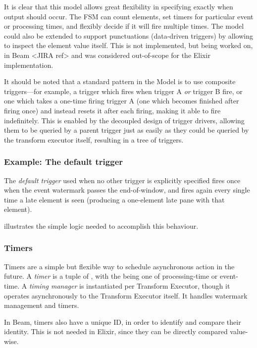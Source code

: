 It is clear that this model allows great flexibility in specifying exactly when output should occur.
The FSM can count elements, set timers for particular event or processing times, and flexibly decide if it will fire multiple times.
The model could also be extended to support punctuations (data-driven triggers) by allowing  to inspect the element value itself.
This is not implemented, but being worked on, in Beam <JIRA ref> and was considered out-of-scope for the Elixir implementation.

It should be noted that a standard pattern in the Model is to use composite triggers---for example, a trigger which fires when trigger A \emph{or} trigger B fire, or one which takes a one-time firing trigger A (one which becomes finished after firing once) and instead resets it after each firing, making it able to fire indefinitely.
This is enabled by the decoupled design of trigger drivers, allowing them to be queried by a parent trigger just as easily as they could be queried by the transform executor itself, resulting in a tree of triggers.

\subsubsection{Example: The default trigger}

The \emph{default trigger} used when no other trigger is explicitly specified fires once when the event watermark passes the end-of-window, and fires again every single time a late element is seen (producing a one-element late pane with that element).

 illustrates the simple logic needed to accomplish this behaviour.

\subsubsection{Timers}

Timers are a simple but flexible way to schedule asynchronous action in the future.
A \emph{timer} is a tuple of \footnotemark, with the  being one of processing-time or event-time.
A \emph{timing manager} is instantiated per Transform Executor, though it operates asynchronously to the Transform Executor itself.
It handles watermark management and timers.

\footnotetext
{
In Beam, timers also have a unique ID, in order to identify and compare their identity. This is not needed in Elixir, since they can be directly compared value-wise.
}

